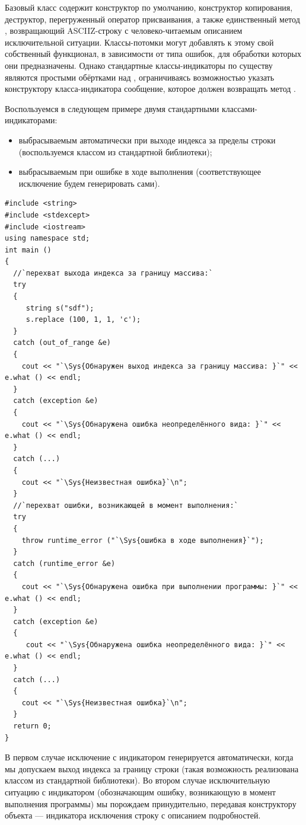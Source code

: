 Базовый класс  содержит конструктор по умолчанию, конструктор копирования, деструктор,
перегруженный оператор присваивания, а также единственный метод , возвращающий
ASCIIZ-строку с человеко-читаемым описанием исключительной ситуации. Классы-потомки могут добавлять к этому свой
собственный функционал, в зависимости от типа ошибок, для обработки которых они предназначены. Однако стандартные
классы-индикаторы по существу являются простыми обёртками над , ограничиваясь
возможностью указать конструктору класса-индикатора сообщение, которое должен возвращать метод
. 

Воспользуемся в следующем примере двумя стандартными классами-индикаторами: 

\begin{itemize}
\item выбрасываемым автоматически при выходе индекса за пределы строки (воспользуемся классом 
 из стандартной библиотеки);
\item выбрасываемым при ошибке в ходе выполнения (соответствующее исключение будем генерировать сами).
\end{itemize}
\begin{lstlisting}
#include <string>
#include <stdexcept>
#include <iostream>
using namespace std;
int main ()
{
  //`перехват выхода индекса за границу массива:`
  try 
  {
     string s("sdf");
     s.replace (100, 1, 1, 'c');
  }
  catch (out_of_range &e) 
  {
    cout << "`\Sys{Обнаружен выход индекса за границу массива: }`" << e.what () << endl;
  }
  catch (exception &e) 
  {
    cout << "`\Sys{Обнаружена ошибка неопределённого вида: }`" << e.what () << endl;
  }
  catch (...) 
  {
    cout << "`\Sys{Неизвестная ошибка}`\n";
  }  
  //`перехват ошибки, возникающей в момент выполнения:`
  try 
  {
    throw runtime_error ("`\Sys{ошибка в ходе выполнения}`");
  }
  catch (runtime_error &e) 
  {
    cout << "`\Sys{Обнаружена ошибка при выполнении программы: }`" << e.what () << endl;
  }
  catch (exception &e) 
  {
     cout << "`\Sys{Обнаружена ошибка неопределённого вида: }`" << e.what () << endl;
  }
  catch (...) 
  {
    cout << "`\Sys{Неизвестная ошибка}`\n";
  }       
  return 0;
}
\end{lstlisting}

В первом случае исключение с индикатором  генерируется автоматически, когда мы
допускаем выход индекса за границу строки (такая возможность реализована классом  из
стандартной библиотеки). Во втором случае исключительную ситуацию с индикатором 
(обозначающим ошибку, возникающую в момент выполнения программы) мы порождаем принудительно, передавая конструктору
объекта --- индикатора исключения строку с описанием подробностей. 

